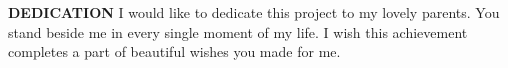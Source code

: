 
\clearpage

\begin{center}
{\LARGE \textbf{DEDICATION}}
\hspace{0pt}
\vfill
I would like to dedicate this project to my lovely parents. You stand beside me in every single moment of my life. I wish this achievement completes a part of beautiful wishes you made for me. 
\vfill
\hspace{0pt}
\end{center}

